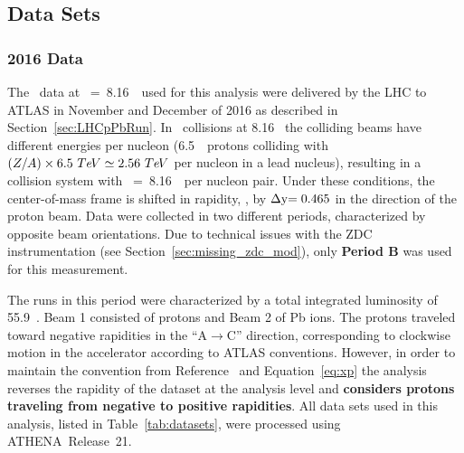 \subsection{Data Sets}

\subsubsection{2016 \texorpdfstring{\pxPb}{p+Pb} Data}
\label{sec:pPbData}
The \pxPb\ data at \SNN~=~8.16~\TeV\ used for this analysis were delivered by the LHC to ATLAS in November and December of 2016 as described in Section~\ref{sec:LHCpPbRun}. In \pxPb\ collisions at 8.16 \TeV\ the colliding beams have different energies per nucleon (6.5~\TeV\ protons colliding with $(Z/A)\times 6.5~Te\kern-0.1em V\simeq 2.56~Te\kern-0.1em V$ per nucleon in a lead nucleus), resulting in a collision system with \SNN~=~8.16~\TeV\ per nucleon pair. Under these conditions, the center-of-mass frame is shifted in rapidity, \RAP, by $\Delta\RAP=0.465$ in the direction of the proton beam. Data were collected in two different periods, characterized by opposite beam orientations. Due to technical issues with the ZDC instrumentation (see Section~\ref{sec:missing_zdc_mod}), only \textbf{Period B} was used for this measurement.

The runs in this period were characterized by a total integrated luminosity of 55.9~\NB.
Beam 1 consisted of protons and Beam 2 of Pb ions.
The protons traveled toward negative rapidities in the ``A$\rightarrow$C'' direction, corresponding to clockwise motion in the accelerator according to ATLAS conventions.
However, in order to maintain the convention from Reference~\cite{HION-2023-05} and Equation~\ref{eq:xp} the analysis reverses the rapidity of the dataset at the analysis level and \textbf{considers protons traveling from negative to positive rapidities}.
All data sets used in this analysis, listed in Table~\ref{tab:datasets}, were processed using \textsc{ATHENA}~Release~21.


